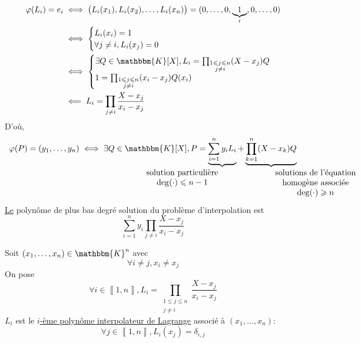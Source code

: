 \begin{exo}
	\begin{align*}
		\varphi(L_i) = e_i &\iff \big(L_i(x_1), L_i(x_2), \ldots, L_i(x_n)\big) = (0, \ldots, 0, \underbrace{1}_i, 0, \ldots, 0) \\
											&\iff \begin{cases}
												L_i(x_i) = 1\\
												\forall j \neq i, L_i(x_j) = 0
											\end{cases}\\
											&\iff \begin{cases}
												\exists Q \in \mathbbm{K}[X], L_i = \prod_{\substack{1 \le j \le n\\ j \neq i}} (X - x_j) Q\\
												1 = \prod_{\substack{1 \le j \le n\\ j \neq i}} (x_i - x_j) Q(x_i)\\
											\end{cases}\\
											&\impliedby L_i = \prod_{j \neq i} \frac{X - x_j}{x_i - x_j}
	\end{align*}
	D'où,
	\[
		\varphi(P) = (y_1, \ldots, y_n) \iff \exists Q \in \mathbbm{K}[X], P = \underbrace{\sum_{i=1}^n y_i L_i}_{\mathllap{\begin{array}{c}
			\text{solution particulière}\\
			\deg(\cdot ) \le n-1
		\end{array}}} + \underbrace{\prod_{k=1}^n (X-x_k)Q}_{\mathrlap{\begin{array}{c}
			\text{solutions de l'équation}\\
			\text{homogène associée}\\
			\deg(\cdot) \ge n
		\end{array}}}
	\]
	\underline{Le} polynôme de plus bas degré solution du problème d'interpolation est \[
		\sum_{i=1}^n y_i \prod_{j \neq i} \frac{X - x_j}{x_i - x_j}
	\]
\end{exo}

\begin{defn}
	Soit $(x_1, \ldots, x_n) \in \mathbbm{K}^n$ avec \[
		\forall i \neq j, x_i \neq x_j
	\] On pose \[
		\forall i \in \left\llbracket 1,n \right\rrbracket,
		L_i = \prod_{\substack{1 \le j \le n\\ j \neq i}} \frac{X - x_j}{x_i - x_j}
	\]
	$L_i$ est le \underline{$i$-ème polynôme interpolateur de Lagrange} associé à $(x_1, \ldots, x_n)$: \[
		\forall j \in \left\llbracket 1,n \right\rrbracket, L_i(x_j) = \delta_{i,j}
	\]
\end{defn}

